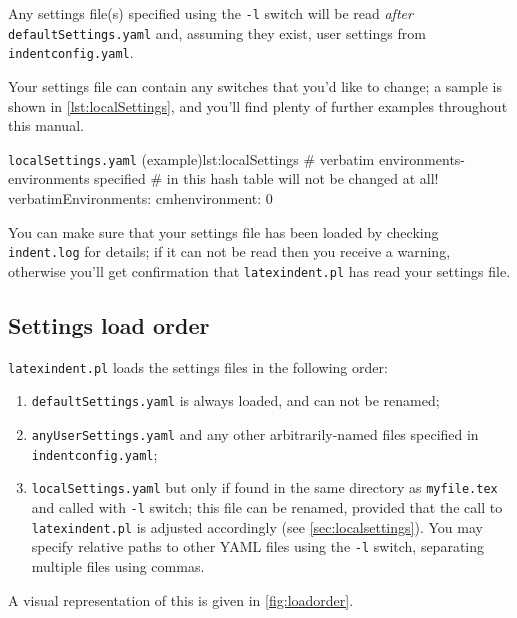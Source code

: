 	Any settings file(s) specified using the \texttt{-l} switch will be read \emph{after} \texttt{defaultSettings.yaml} and, assuming they exist,
	user settings from \texttt{indentconfig.yaml}.

	Your settings file can contain any switches that you'd
	like to change; a sample is shown in \cref{lst:localSettings}, and you'll find plenty of further examples throughout this manual.

	\begin{yaml}{\texttt{localSettings.yaml} (example)}{lst:localSettings}
#  verbatim environments- environments specified
#  in this hash table will not be changed at all!
verbatimEnvironments:
    cmhenvironment: 0
\end{yaml}

	You can make sure that your settings file has been loaded by checking \texttt{indent.log}
	for details; if it can not be read then you receive a warning, otherwise you'll get confirmation that
	\texttt{latexindent.pl} has read your settings file.

\subsection{Settings load order}\label{sec:loadorder}
	\texttt{latexindent.pl} loads the settings files in the following order:
	\begin{enumerate}
		\item \texttt{defaultSettings.yaml} is always loaded, and can not be renamed;
		\item \texttt{anyUserSettings.yaml} and any other arbitrarily-named files specified in \texttt{indentconfig.yaml};
		\item \texttt{localSettings.yaml} but only if found in the same directory as \texttt{myfile.tex} and called
		      with \texttt{-l} switch; this file can be renamed, provided that the call to \texttt{latexindent.pl} is adjusted
		      accordingly (see \cref{sec:localsettings}). You may specify relative  paths to other
		      YAML files using the \texttt{-l} switch, separating multiple files using commas.
	\end{enumerate}
	A visual representation of this is given in \cref{fig:loadorder}.

